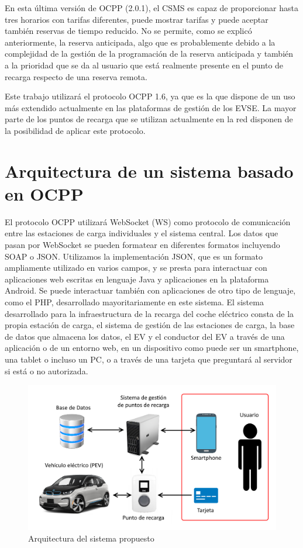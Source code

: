 \documentclass[12pt,a4paper,onecolumn,oneside]{report}
\begin{document}
En esta última versión de OCPP (2.0.1), el CSMS es capaz de proporcionar hasta tres horarios con tarifas diferentes, puede mostrar tarifas y puede aceptar también reservas de tiempo reducido. No se permite, como se explicó anteriormente, la reserva anticipada, algo que es probablemente debido a la complejidad de la gestión de la programación de la reserva anticipada y también a la prioridad que se da al usuario que está realmente presente en el punto de recarga respecto de una reserva remota.

Este trabajo utilizará el protocolo OCPP 1.6, ya que es la que dispone de un uso más extendido actualmente en las plataformas de gestión de los EVSE. La mayor parte de los puntos de recarga que se utilizan actualmente en la red disponen de la posibilidad de aplicar este protocolo.

\chapter{Arquitectura de un sistema basado en OCPP}
\label{Arquitectura de un sistema basado en OCPP}

El protocolo OCPP utilizará WebSocket (WS) como protocolo de comunicación entre las estaciones de carga individuales y el sistema central. Los datos que pasan por WebSocket se pueden formatear en diferentes formatos incluyendo SOAP o JSON. Utilizamos la implementación JSON, que es un formato ampliamente utilizado en varios campos, y se presta para interactuar con aplicaciones web escritas en lenguaje Java y aplicaciones en la plataforma Android. Se puede interactuar también con aplicaciones de otro tipo de lenguaje, como el PHP, desarrollado mayoritariamente en este sistema. El sistema desarrollado para la infraestructura de la recarga del coche eléctrico consta de la propia estación de carga, el sistema de gestión de las estaciones de carga, la base de datos que almacena los datos, el EV y el conductor del EV a través de una aplicación o de un entorno web, en un dispositivo como puede ser un smartphone, una tablet o incluso un PC, o a través de una tarjeta que preguntará al servidor si está o no autorizada.


\begin{figure}[H] 
\centering
  \includegraphics[width=.75\textwidth]{figuras/esquema.png}
  \caption[Arquitectura del sistema propuesto]{Arquitectura del sistema propuesto\\
  }
  \label{fig:arquitectura}
\end{figure}
\end{document}
